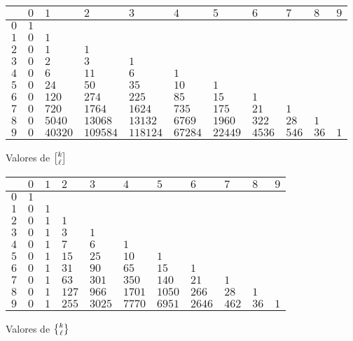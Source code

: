 \documentclass{article}
\numberwithin{equation}{section}
\theoremstyle{definition}
\begin{document}
\begin{center}
{\small
\noindent\begin{tabular}{|f{0.9cm}|f{0.9cm}|f{0.9cm}|f{0.9cm}|f{0.9cm}|f{0.9cm}|f{0.9cm}|f{0.9cm}|f{0.9cm}|f{0.9cm}|f{0.9cm}|}
\hline
{} & $0$ & $1$ & $2$ & $3$ & $4$ & $5$ & $6$ & $7$ & $8$ & $9$ \tabularnewline\hline
$0$ & $1$ &  &  &  &  &  &  &  &  & \tabularnewline\hline
$1$ & $0$ & $1$ &  &  &  &  &  &  &  & \tabularnewline\hline
$2$ & $0$ & $1$ & $1$ &  &  &  &  &  &  & \tabularnewline\hline
$3$ & $0$ & $2$ & $3$ & $1$ &  &  &  &  &  & \tabularnewline\hline
$4$ & $0$ & $6$ & $11$ & $6$ & $1$ &  &  &  &  & \tabularnewline\hline
$5$ & $0$ & $24$ & $50$ & $35$ & $10$ & $1$ &  &  &  & \tabularnewline\hline
$6$ & $0$ & $120$ & $274$ & $225$ & $85$ & $15$ & $1$ &  &  & \tabularnewline\hline
$7$ & $0$ & $720$ & $1764$ & $1624$ & $735$ & $175$ & $21$ & $1$ &  & \tabularnewline\hline
$8$ & $0$ & $5040$ & $13068$ & $13132$ & $6769$ & $1960$ & $322$ & $28$ & $1$ & \tabularnewline\hline
$9$ & $0$ & $40320$ & $109584$ & $118124$ & $67284$ & $22449$ & $4536$ & $546$ & $36$ & $1$ \tabularnewline\hline
\end{tabular}}

\vspace{1em}

\noindent Valores de $\stirling{k}{\ell}$

\vspace{\fill}

{\small
\noindent\begin{tabular}{|f{0.9cm}|f{0.9cm}|f{0.9cm}|f{0.9cm}|f{0.9cm}|f{0.9cm}|f{0.9cm}|f{0.9cm}|f{0.9cm}|f{0.9cm}|f{0.9cm}|}
\hline
{} & $0$ & $1$ & $2$ & $3$ & $4$ & $5$ & $6$ & $7$ & $8$ & $9$ \tabularnewline\hline
$0$ & $1$ &  &  &  &  &  &  &  &  & \tabularnewline\hline
$1$ & $0$ & $1$ &  &  &  &  &  &  &  & \tabularnewline\hline
$2$ & $0$ & $1$ & $1$ &  &  &  &  &  &  & \tabularnewline\hline
$3$ & $0$ & $1$ & $3$ & $1$ &  &  &  &  &  & \tabularnewline\hline
$4$ & $0$ & $1$ & $7$ & $6$ & $1$ &  &  &  &  & \tabularnewline\hline
$5$ & $0$ & $1$ & $15$ & $25$ & $10$ & $1$ &  &  &  & \tabularnewline\hline
$6$ & $0$ & $1$ & $31$ & $90$ & $65$ & $15$ & $1$ &  &  & \tabularnewline\hline
$7$ & $0$ & $1$ & $63$ & $301$ & $350$ & $140$ & $21$ & $1$ &  & \tabularnewline\hline
$8$ & $0$ & $1$ & $127$ & $966$ & $1701$ & $1050$ & $266$ & $28$ & $1$ & \tabularnewline\hline
$9$ & $0$ & $1$ & $255$ & $3025$ & $7770$ & $6951$ & $2646$ & $462$ & $36$ & $1$ \tabularnewline\hline
\end{tabular}}

\vspace{1em}

\noindent Valores de $\Stirling{k}{\ell}$
\end{center}
\end{document}
